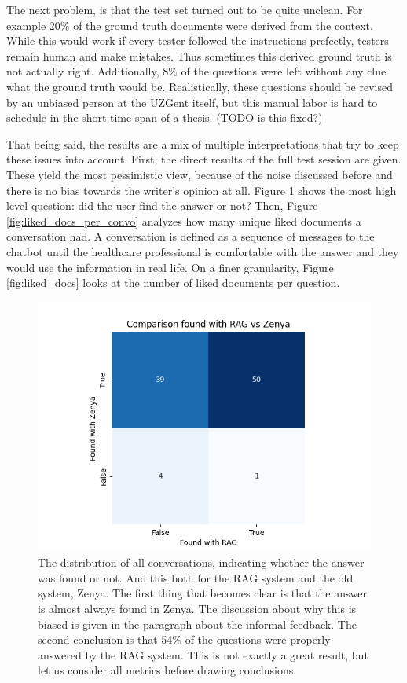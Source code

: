 The next problem, is that the test set turned out to be quite unclean. For example 20\% of the ground truth documents were derived from the context. While this would work if every tester followed the instructions prefectly, testers remain human and make mistakes. Thus sometimes this derived ground truth is not actually right. Additionally, 8\% of the questions were left without any clue what the ground truth would be. Realistically, these questions should be revised by an unbiased person at the UZGent itself, but this manual labor is hard to schedule in the short time span of a thesis. (TODO is this fixed?)

That being said, the results are a mix of multiple interpretations that try to keep these issues into account. First, the direct results of the full test session are given. These yield the most pessimistic view, because of the noise discussed before and there is no bias towards the writer's opinion at all. Figure \ref{fig:found_rate} shows the most high level question: did the user find the answer or not? Then, Figure \ref{fig:liked_docs_per_convo} analyzes how many unique liked documents a conversation had. A conversation is defined as a sequence of messages to the chatbot until the healthcare professional is comfortable with the answer and they would use the information in real life. On a finer granularity, Figure \ref{fig:liked_docs} looks at the number of liked documents per question.

\begin{figure}[H]
    \captionsetup{justification=centering}
    \centerline{\includegraphics[width=0.9\linewidth]{fig/RAG_found_plot.png}}
    \caption{The distribution of all conversations, indicating whether the answer was found or not. And this both for the RAG system and the old system, Zenya. The first thing that becomes clear is that the answer is almost always found in Zenya. The discussion about why this is biased is given in the paragraph about the informal feedback. The second conclusion is that 54\% of the questions were properly answered by the RAG system. This is not exactly a great result, but let us consider all metrics before drawing conclusions.}
    \label{fig:found_rate}
\end{figure}

